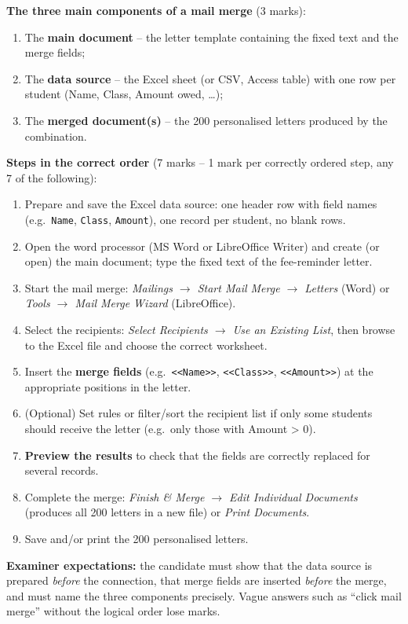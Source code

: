 \documentclass[11pt]{article}
\begin{document}
\begin{corrige}
\textbf{The three main components of a mail merge} (3 marks):
\begin{enumerate}
\item The \textbf{main document} -- the letter template containing the fixed text and the merge fields;
\item The \textbf{data source} -- the Excel sheet (or CSV, Access table) with one row per student (Name, Class, Amount owed, \dots);
\item The \textbf{merged document(s)} -- the 200 personalised letters produced by the combination.
\end{enumerate}

\textbf{Steps in the correct order} (7 marks -- 1 mark per correctly ordered step, any 7 of the following):
\begin{enumerate}
\item Prepare and save the Excel data source: one header row with field names (e.g.\ \texttt{Name}, \texttt{Class}, \texttt{Amount}), one record per student, no blank rows.
\item Open the word processor (MS Word or LibreOffice Writer) and create (or open) the main document; type the fixed text of the fee-reminder letter.
\item Start the mail merge: \emph{Mailings $\rightarrow$ Start Mail Merge $\rightarrow$ Letters} (Word) or \emph{Tools $\rightarrow$ Mail Merge Wizard} (LibreOffice).
\item Select the recipients: \emph{Select Recipients $\rightarrow$ Use an Existing List}, then browse to the Excel file and choose the correct worksheet.
\item Insert the \textbf{merge fields} (e.g.\ \texttt{<<Name>>}, \texttt{<<Class>>}, \texttt{<<Amount>>}) at the appropriate positions in the letter.
\item (Optional) Set rules or filter/sort the recipient list if only some students should receive the letter (e.g.\ only those with Amount > 0).
\item \textbf{Preview the results} to check that the fields are correctly replaced for several records.
\item Complete the merge: \emph{Finish \& Merge $\rightarrow$ Edit Individual Documents} (produces all 200 letters in a new file) or \emph{Print Documents}.
\item Save and/or print the 200 personalised letters.
\end{enumerate}

\textbf{Examiner expectations:} the candidate must show that the data source is prepared \emph{before} the connection, that merge fields are inserted \emph{before} the merge, and must name the three components precisely. Vague answers such as ``click mail merge'' without the logical order lose marks.
\end{corrige}
\end{document}

